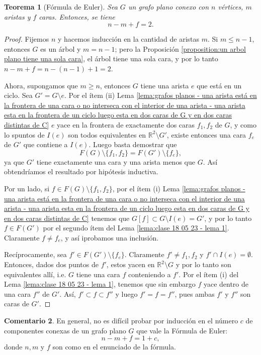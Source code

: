 \documentclass[12pt]{report}
\theoremstyle{plain}
\newtheorem{theorem}{Teorema}[section]
\theoremstyle{definition}
\newtheorem{remark}[theorem]{Comentario}
\newcommand{\reals}{\mathbb{R}}
\begin{document}
\begin{theorem}[Fórmula de Euler]\label{th:formula de Euler}
Sea $G$ un grafo plano conexo con $n$ vértices, $m$ aristas y $f$ caras. Entonces, se tiene
\[
    \boxed{n - m + f = 2.}
\]
\end{theorem}
\begin{proof}
Fijemos $n$ y hacemos inducción en la cantidad de aristas $m$. Si $m \leq n -1$, entonces $G$ es un árbol y $m = n-1$; pero la Proposición \ref{proposition:un arbol plano tiene una sola cara}, el árbol tiene una sola cara, y por lo tanto $n - m + f = n - (n-1) + 1 = 2$.

Ahora, supongamos que $m \geq n$, entonces $G$ tiene una arista $e$ que está en un ciclo. Sea $G' = G \setminus e$. Por el ítem (ii) Lema \ref{lema:grafos planos - una arista está en la frontera de una cara o no interseca con el interior de una arista - una arista esta en la frontera de un ciclo luego esta en dos caras de G y en dos caras distintas de C} $e$ yace en la frontera de exactamente dos caras $f_1,f_2$ de $G$, y como lo spuntos de $I(e)$ son todos equivalentes en $\reals^2 \setminus G'$, existe entonces una cara $f_e$ de $G'$ que contiene a $I(e)$.
Luego basta demostrar que
\[
    F (G) \setminus \{f_1, f_2 \} = F (G') \setminus \{f_e\},
\]
ya que $G'$ tiene exactamente una cara y una arista menos que $G$. Así obtendríamos el resultado por hipótesis inductiva.

Por un lado, si $f \in F(G) \setminus \{f_1,f_2\}$, por el ítem (i) Lema \ref{lema:grafos planos - una arista está en la frontera de una cara o no interseca con el interior de una arista - una arista esta en la frontera de un ciclo luego esta en dos caras de G y en dos caras distintas de C} tenemos que $G[f] \subset G \setminus I(e) = G'$, y por lo tanto $f \in F(G')$ por el segundo ítem del Lema \ref{lema:clase 18 05 23 - lema 1}. Claramente $f \neq f_e$, y así iprobamos una inclusión.

Recíprocamente, sea $f' \in F(G') \setminus \{f_e\}$. Claramente $f' \neq f_1, f_2$ y $f' \cap I(e) = \emptyset$. Entonces, dados dos puntos de $f'$, estos yacen en $\reals^2 \setminus G$ y por lo tanto son equivalentes allí, i.e. $G$ tiene una cara $f$ conteniendo a $f'$. Por el ítem (i) del Lema \ref{lema:clase 18 05 23 - lema 1}, tenemos que sin embargo $f$ yace dentro de una cara $f''$ de $G'$. Así, $f' \subset f \subset f''$ y luego $f' = f = f''$, pues ambas $f'$ y $f''$ son caras de $G'$.
\end{proof}


\begin{remark}
En general, no es difícil probar por inducción en el número $c$ de componentes conexas de un grafo plano $G$ que vale la Fórmula de Euler:
\[
    n - m + f = 1 + c,
\]
donde $n,m$ y $f$ son como en el enunciado de la fórmula.
\end{remark}
\end{document}
